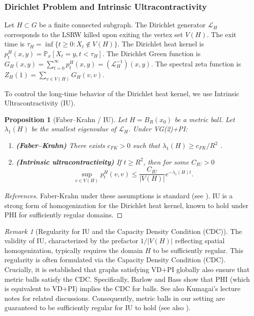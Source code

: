 \documentclass[12pt]{amsart}
\newtheorem{proposition}[theorem]{Proposition}
\theoremstyle{definition}
\theoremstyle{remark}
\newtheorem{remark}[theorem]{Remark}
\newcommand{\LL}{\mathcal{L}} %
\newcommand{\Prob}{\mathbb{P}}
\begin{document}
\subsubsection{Dirichlet Problem and Intrinsic Ultracontractivity}
Let $H \subset G$ be a finite connected subgraph.
The Dirichlet generator $\LL_H$ corresponds to the LSRW killed upon exiting the vertex set $V(H)$. The exit time is $\tau_H = \inf\{t \geq 0 : X_t \notin V(H)\}$.
The Dirichlet heat kernel is $p_t^H(x,y) = \Prob_x[X_t = y, t < \tau_H]$. The Dirichlet Green function is $G_H(x,y) = \sum_{t=0}^{\infty} p_t^H(x,y) = (\LL_H^{-1})(x,y)$. The spectral zeta function is $Z_H(1) = \sum_{v \in V(H)} G_H(v,v)$.

To control the long-time behavior of the Dirichlet heat kernel, we use Intrinsic Ultracontractivity (IU).

\begin{proposition}[Faber--Krahn / IU]\label{prop:IU}
Let $H=B_R(x_0)$ be a metric ball. Let $\lambda_1(H)$ be the smallest eigenvalue of $\LL_H$. Under VG(2)+PI:
\begin{enumerate}
    \item \textbf{(Faber--Krahn)} There exists $c_{FK}>0$ such that $\lambda_1(H)\ge c_{FK}/R^{2}$ \cite[Prop.\,5.1]{BarlowBass04}.
    \item \textbf{(Intrinsic ultracontractivity)}
          If $t\ge R^{2}$, then for some $C_{IU}>0$
    \begin{equation}\label{eq:IU}
        \sup_{v \in V(H)} p_t^H(v,v) \leq \frac{C_{IU}}{|V(H)|} e^{-\lambda_1(H) t}.
    \end{equation}
\end{enumerate}
\end{proposition}
\begin{proof}[References]
Faber-Krahn under these assumptions is standard (see \cite{Grigoryan09}). IU is a strong form of homogenization for the Dirichlet heat kernel, known to hold under PHI for sufficiently regular domains.
\end{proof}


\begin{remark}[Regularity for IU and the Capacity Density Condition (CDC)]\label{rem:IU_regularity}
The validity of IU, characterized by the prefactor $1/|V(H)|$ reflecting spatial homogenization, typically requires the domain $H$ to be sufficiently regular. This regularity is often formulated via the Capacity Density Condition (CDC). Crucially, it is established that graphs satisfying VD+PI globally also ensure that metric balls satisfy the CDC.
Specifically, Barlow and Bass \cite[Proposition 3.5]{BarlowBass04} show that PHI (which is equivalent to VD+PI) implies the CDC for balls. See also Kumagai's lecture notes \cite{KumagaiNotes} for related discussions. Consequently, metric balls in our setting are guaranteed to be sufficiently regular for IU to hold (see also \cite{BassKumagai08}).
\end{remark}
\end{document}

